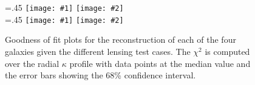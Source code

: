 \documentclass[onecolumn,galley]{mn2e}
\newcommand{\figref}[1] {Figure~\ref{#1}}
\newcommand\plotone[1]{%
 \centering
 \leavevmode
 \texttt{[image: \#1]}%
}%
\newcommand\plottwo[2]{{%
 \centering
 \leavevmode
 \columnwidth=.45\columnwidth
 \texttt{[image: \#1]}%
 \hfil
 \texttt{[image: \#2]}%
}}%
\begin{document}
\begin{figure}
\label{chi2}
\plottwo{AAchi2_profile.pdf}{AAchi2_profile.pdf} \\
\plottwo{BBchi2_profile.pdf}{BCchi2_profile.pdf}
\caption{
Goodness of fit plots for the reconstruction of each of the four galaxies given
the different lensing test cases. The $\chi^2$ is computed over the radial $\kappa$
profile with data points at the median value and the error bars showing the 68\% confidence
interval.
}
\end{figure}

%
%
%
%
%
%
%
%
%

\end{document}
